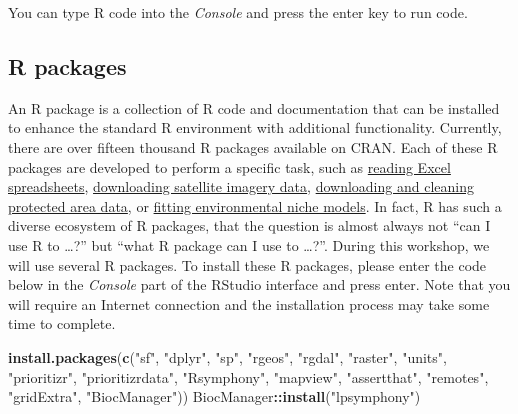 \documentclass[12pt,]{book}
\newenvironment{Shaded}{\begin{snugshade}}{\end{snugshade}}
\newcommand{\KeywordTok}[1]{\textcolor[rgb]{0.13,0.29,0.53}{\textbf{#1}}}
\newcommand{\StringTok}[1]{\textcolor[rgb]{0.31,0.60,0.02}{#1}}
\newcommand{\OperatorTok}[1]{\textcolor[rgb]{0.81,0.36,0.00}{\textbf{#1}}}
\newcommand{\NormalTok}[1]{#1}
\begin{document}
You can type R code into the \emph{Console} and press the enter key to
run code.

\subsection{R packages}\label{r-packages}

An R package is a collection of R code and documentation that can be
installed to enhance the standard R environment with additional
functionality. Currently, there are over fifteen thousand R packages
available on CRAN. Each of these R packages are developed to perform a
specific task, such as
\href{https://cran.r-project.org/web/packages/readxl/index.html}{reading
Excel spreadsheets},
\href{https://cran.r-project.org/web/packages/MODIStsp/index.html}{downloading
satellite imagery data},
\href{https://cran.r-project.org/web/packages/wdpar/index.html}{downloading
and cleaning protected area data}, or
\href{https://cran.r-project.org/web/packages/ENMeval/index.html}{fitting
environmental niche models}. In fact, R has such a diverse ecosystem of
R packages, that the question is almost always not ``can I use R to
\ldots{}?'' but ``what R package can I use to \ldots{}?''. During this
workshop, we will use several R packages. To install these R packages,
please enter the code below in the \emph{Console} part of the RStudio
interface and press enter. Note that you will require an Internet
connection and the installation process may take some time to complete.

\begin{Shaded}
\begin{Highlighting}[]
\KeywordTok{install.packages}\NormalTok{(}\KeywordTok{c}\NormalTok{(}\StringTok{"sf"}\NormalTok{, }\StringTok{"dplyr"}\NormalTok{, }\StringTok{"sp"}\NormalTok{, }\StringTok{"rgeos"}\NormalTok{, }\StringTok{"rgdal"}\NormalTok{, }\StringTok{"raster"}\NormalTok{,}
                   \StringTok{"units"}\NormalTok{, }\StringTok{"prioritizr"}\NormalTok{, }\StringTok{"prioritizrdata"}\NormalTok{, }\StringTok{"Rsymphony"}\NormalTok{,}
                   \StringTok{"mapview"}\NormalTok{, }\StringTok{"assertthat"}\NormalTok{, }\StringTok{"remotes"}\NormalTok{, }\StringTok{"gridExtra"}\NormalTok{,}
                   \StringTok{"BiocManager"}\NormalTok{))}
\NormalTok{BiocManager}\OperatorTok{::}\KeywordTok{install}\NormalTok{(}\StringTok{"lpsymphony"}\NormalTok{)}
\end{Highlighting}
\end{Shaded}
\end{document}
